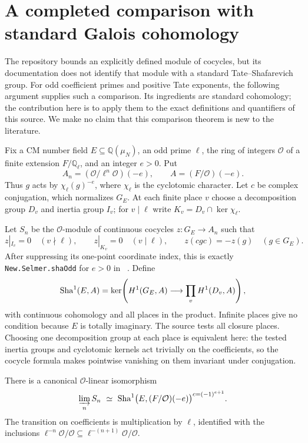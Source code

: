 \section{A completed comparison with standard Galois cohomology}
\label{sec:odd-sha-comparison}

The repository bounds an explicitly defined module of cocycles, but its
documentation does not identify that module with a standard
Tate--Shafarevich group. For odd coefficient primes and positive Tate
exponents, the following argument supplies such a comparison. Its ingredients
are standard cohomology; the contribution here is to apply them to the exact
definitions and quantifiers of this source. We make no claim that this
comparison theorem is new to the literature.

Fix a CM number field $E\subseteq\mathbb Q(\mu_N)$, an odd prime $\ell$, the
ring of integers $\mathcal O$ of a finite extension $F/\mathbb Q_\ell$, and
an integer $e>0$. Put
\[
 A_n=(\mathcal O/\ell^n\mathcal O)(-e),\qquad
 A=(F/\mathcal O)(-e).
\]
Thus $g$ acts by $\chi_\ell(g)^{-e}$, where $\chi_\ell$ is the cyclotomic
character. Let $c$ be complex conjugation, which normalizes $G_E$. At each
finite place $v$ choose a decomposition group $D_v$ and inertia group $I_v$;
for $v\mid\ell$ write $K_v=D_v\cap\ker\chi_\ell$.

Let $S_n$ be the $\mathcal O$-module of continuous cocycles $z:G_E\to A_n$
such that
\[
 z|_{I_v}=0\quad(v\nmid\ell),\qquad
 z|_{K_v}=0\quad(v\mid\ell),\qquad
 z(cgc)=-z(g)\quad(g\in G_E).
\]
After suppressing its one-point coordinate index, this is exactly
\texttt{New.Selmer.shaOdd} for $e>0$ in
~\cite{oddsha}. Define
\[
 \operatorname{Sha}^1(E,A)=\ker\!\left(
 H^1(G_E,A)\longrightarrow\prod_v H^1(D_v,A)\right),
\]
with continuous cohomology and all places in the product. Infinite places
give no condition because $E$ is totally imaginary. The source tests all
closure places. Choosing one decomposition group at each place is
equivalent here: the tested inertia groups and cyclotomic kernels act
trivially on the coefficients, so the cocycle formula makes pointwise
vanishing on them invariant under conjugation.

\begin{theorem}
\label{thm:odd-sha-comparison}
There is a canonical $\mathcal O$-linear isomorphism
\[
 \varinjlim_n S_n\ \simeq\
 \operatorname{Sha}^1\bigl(E,(F/\mathcal O)(-e)\bigr)^{c=(-1)^{e+1}}.
\]
The transition on coefficients is multiplication by $\ell$, identified with
the inclusions
$\ell^{-n}\mathcal O/\mathcal O\subseteq
 \ell^{-(n+1)}\mathcal O/\mathcal O$.
\end{theorem}

